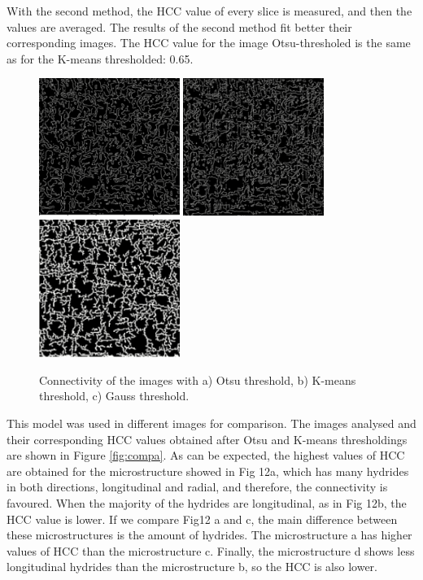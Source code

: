 With the second method, the HCC value of every slice is measured, and then the values are averaged. The results of the second method fit better their corresponding images. The HCC value for the image Otsu-thresholed is the same as for the K-means thresholded: 0.65. 

\begin{figure}[h] %
    \centering
    \includegraphics[width=1.8in]{Figures/5-Results/Otsu.PNG}
    \includegraphics[width=1.8in]{Figures/5-Results/Kmeans.PNG}
    \includegraphics[width=1.8in]{Figures/5-Results/Gauss.PNG}
    \caption{Connectivity of the images with a) Otsu threshold, b) K-means threshold, c) Gauss threshold.}
    \label{fig:connectivity}
\end{figure}

This model was used in different images for comparison. The images analysed and their corresponding HCC values obtained after Otsu and K-means thresholdings are shown in Figure \ref{fig:compa}. As can be expected, the highest values of HCC are obtained for the microstructure showed in Fig 12a, which has many hydrides in both directions, longitudinal and radial, and therefore, the connectivity is favoured. When the majority of the hydrides are longitudinal, as in Fig 12b, the HCC value is lower. If we compare Fig12 a and c, the main difference between these microstructures is the amount of hydrides. The microstructure a has higher values of HCC than the microstructure c. Finally, the microstructure d shows less longitudinal hydrides than the microstructure b, so the HCC is also lower.


